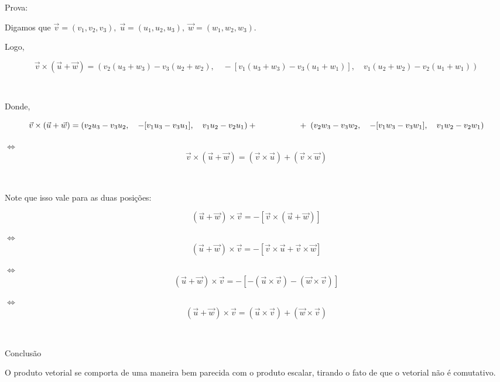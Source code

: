 Prova:

Digamos que \( \vec{v} = (v_1, v_2, v_3),\; \vec{u} = (u_1, u_2, u_3),\; \vec{w} = (w_1, w_2, w_3) \).

Logo,

\[
\vec{v} \times (\vec{u} + \vec{w}) = (v_2(u_3 + w_3) - v_3(u_2 + w_2),\quad -[v_1(u_3 + w_3) - v_3(u_1 + w_1)],\quad v_1(u_2 + w_2) - v_2(u_1 + w_1))
\]

 

Donde,

\[
\vec{v} \times (\vec{u} + \vec{w}) = (v_2u_3 - v_3u_2,\quad -[v_1u_3 - v_3u_1],\quad v_1u_2 - v_2u_1) + \\
\quad \quad \quad \quad \quad + \;(v_2w_3 - v_3w_2,\quad -[v_1w_3 - v_3w_1],\quad v_1w_2 - v_2w_1)
\]

\(\Longleftrightarrow\) \[
\vec{v} \times (\vec{u} + \vec{w}) = (\vec{v} \times \vec{u}) + (\vec{v} \times \vec{w})
\]

 

Note que isso vale para as duas posições:

\[
(\vec{u} + \vec{w}) \times \vec{v} =-[\vec{v} \times (\vec{u} + \vec{w})]
\]

\(\Longleftrightarrow\) \[
(\vec{u} + \vec{w}) \times \vec{v} =-[\vec{v} \times \vec{u} + \vec{v} \times \vec{w}]
\]

\(\Longleftrightarrow\) \[
(\vec{u} + \vec{w}) \times \vec{v} =-[-(\vec{u} \times \vec{v}) - (\vec{w} \times \vec{v})]
\]

\(\Longleftrightarrow\) \[
(\vec{u} + \vec{w}) \times \vec{v} =(\vec{u} \times \vec{v}) + (\vec{w} \times \vec{v})
\]

 

Conclusão

O produto vetorial se comporta de uma maneira bem parecida com o produto escalar, tirando o fato de que o vetorial não é comutativo.